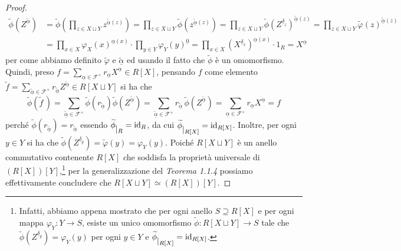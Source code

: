 \documentclass{article}
\theoremstyle{definition}
\begin{document}
\begin{proof}
{\setlength{\belowdisplayskip}{2.5pt} \setlength{\abovedisplayskip}{5pt}\begin{align*} \widetilde{\phi}(Z^{\widetilde{\underline{\alpha}}}) &= \widetilde{\phi}\left( \prod\limits_{z\in X\sqcup Y} z^{\widetilde{\underline{\alpha}}(z)} \right) = \prod\limits_{z\in X\sqcup Y} \widetilde{\phi}\left(z^{\widetilde{\underline{\alpha}}(z)}\right) = \prod\limits_{z\in X\sqcup Y} \widetilde{\phi}\left(Z^{\underline{\delta}_z}\right)^{\widetilde{\underline{\alpha}}(z)} = \prod\limits_{z\in X\sqcup Y} \widetilde{\varphi}(z)^{\widetilde{\underline{\alpha}}(z)} \\ &= \prod\limits_{x\in X} \varphi_X(x)^{\underline{\alpha}(x)}\cdot \prod\limits_{y\in Y} \varphi_Y(y)^{\underline{0}} = \prod\limits_{x\in X} (X^{\underline{\delta}_x})^{\underline{\alpha}(x)}\cdot 1_R = X^{\underline{\alpha}} \end{align*}}\noindent per come abbiamo definito $\widetilde{\varphi}$ e $\underline{\widetilde{\alpha}}$ ed usando il fatto che $\widetilde{\phi}$ è un omomorfismo. Quindi, preso $f=\sum\limits_{\underline{\alpha}\in \mathcal{F}^{\times}} r_{\underline{\alpha}} X^{\underline{\alpha}}\in R[X]$, pensando $f$ come elemento $\widetilde{f}=\sum\limits_{\widetilde{\underline{\alpha}}\in \mathcal{F}^{\times}} r_{\widetilde{\underline{\alpha}}} Z^{\widetilde{\underline{\alpha}}}\in R[X\sqcup Y]$ si ha che \[ \widetilde{\phi}(\widetilde{f}\,) = \sum\limits_{\widetilde{\underline{\alpha}}\in \mathcal{F}^{\times}} \widetilde{\phi}(r_{\widetilde{\underline{\alpha}}}) \widetilde{\phi}(Z^{\widetilde{\underline{\alpha}}}) = \sum\limits_{\widetilde{\underline{\alpha}}\in \mathcal{F}^{\times}} r_{\widetilde{\underline{\alpha}}}\,\widetilde{\phi}(Z^{\widetilde{\underline{\alpha}}}) = \sum\limits_{\underline{\alpha}\in \mathcal{F}^{\times}} r_{\underline{\alpha}} X^{\underline{\alpha}} = f \] perché $\widetilde{\phi}(r_{\widetilde{\underline{\alpha}}})=r_{\widetilde{\underline{\alpha}}}$ essendo $\widetilde{\phi} \raisebox{-.5em}{$\vert_{R}$}= \operatorname{id}_R$, da cui $\widetilde{\phi} \raisebox{-.5em}{$\vert_{R[X]}$}=\operatorname{id}_{R[X]}$. Inoltre, per ogni $y\in Y$ si ha che $\widetilde{\phi}(Z^{\underline{\delta}_y})=\widetilde{\varphi}(y)=\varphi_Y(y)$. Poiché $R[X\sqcup Y]$ è un anello commutativo contenente $R[X]$ che soddisfa la proprietà universale di $(R[X])[Y]$,\footnote{Infatti, abbiamo appena mostrato che per ogni anello $S\supseteq R[X]$ e per ogni mappa $\varphi_Y\colon Y\to S$, esiste un unico omomorfismo $\widetilde{\phi}\colon R[X\sqcup Y]\to S$ tale che $\widetilde{\phi}(Z^{\underline{\delta}_y})=\varphi_Y(y)$ per ogni $y\in Y$ e $\widetilde{\phi} \raisebox{-.5em}{$\vert_{R[X]}$}=\operatorname{id}_{R[X]}$.} per la generalizzazione del \emph{Teorema 1.1.4} possiamo effettivamente concludere che $R[X \sqcup Y]\simeq (R[X])[Y]$.
\end{proof}
\clearpage
\end{document}
